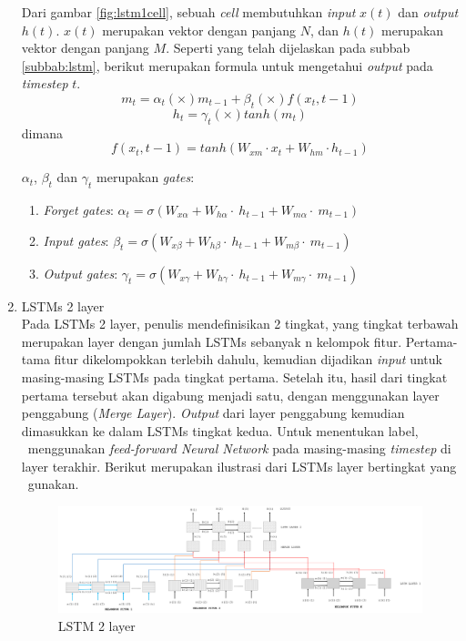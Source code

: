 \begin{enumerate}
	Dari gambar \ref{fig:lstm1cell}, sebuah \textit{cell} membutuhkan \textit{input} $ x(t) $ dan \textit{output} $ h(t) $. $ x(t) $ merupakan vektor dengan panjang $ N $, dan $ h(t) $ merupakan vektor dengan panjang $ M $. Seperti yang telah dijelaskan pada subbab \ref{subbab:lstm}, berikut merupakan formula untuk mengetahui \textit{output} pada \textit{timestep} $ t $.
	\begin{equation}\label{eq:lstmm}
	m_{t}=\alpha_{t} (\times) m_{t-1} + \beta_{t} (\times) f(x_{t},{t-1})
	\end{equation}
	\begin{equation}\label{eq:lstmh}
	h_{t}=\gamma_{t} (\times) tanh(m_{t})
	\end{equation}
	dimana
	\begin{equation}\label{eq:lstmx}
	f(x_{t},{t-1})=tanh(W_{xm} \cdot x_{t} + W_{hm} \cdot h_{t-1})
	\end{equation}
	
	$ \alpha_t $, $ \beta_t $ dan $ \gamma_t $ merupakan \textit{gates}:
	\begin{enumerate}
		\item \textit{Forget gates}: $ \alpha_{t}=\sigma(W_{x\alpha}+W_{h\alpha}\cdot~h_{t-1}+W_{m\alpha}\cdot~m_{t-1}) $
		\item \textit{Input gates}: $ \beta_{t}=\sigma(W_{x\beta}+W_{h\beta}\cdot~h_{t-1}+W_{m\beta}\cdot~m_{t-1}) $
		\item \textit{Output gates}: $ \gamma_{t}=\sigma(W_{x\gamma}+W_{h\gamma}\cdot~h_{t-1}+W_{m\gamma}\cdot~m_{t-1}) $
	\end{enumerate}

	\item LSTMs 2 layer\\
	Pada LSTMs 2 layer, penulis mendefinisikan 2 tingkat, yang tingkat terbawah merupakan layer dengan jumlah LSTMs sebanyak n kelompok fitur. Pertama-tama fitur dikelompokkan terlebih dahulu, kemudian dijadikan \textit{input} untuk masing-masing LSTMs pada tingkat pertama. Setelah itu, hasil dari tingkat pertama tersebut akan digabung menjadi satu, dengan menggunakan layer penggabung (\textit{Merge Layer}). \textit{Output} dari layer penggabung kemudian dimasukkan ke dalam LSTMs tingkat kedua. Untuk menentukan label, \saya~menggunakan \textit{feed-forward Neural Network} pada masing-masing \textit{timestep} di layer terakhir. Berikut merupakan ilustrasi dari LSTMs layer bertingkat yang \saya~gunakan.
	
	\begin{figure}
		\centering
		\includegraphics[width=1.0\linewidth]{images/lstm2}
		\caption{LSTM 2 layer}
		\label{fig:lstm2}
	\end{figure}


\end{enumerate}
